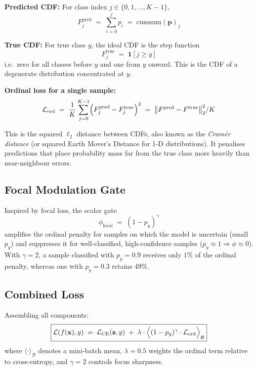 \documentclass[12pt, a4paper]{article}
\theoremstyle{definition}
\theoremstyle{remark}
\begin{document}
\textbf{Predicted CDF:} For class index $j \in \{0, 1, \ldots, K{-}1\}$,
\begin{equation}
    F_j^{\mathrm{pred}} \;=\; \sum_{i=0}^{j} p_i
    \;=\; \mathrm{cumsum}(\mathbf{p})_j
    \label{eq:predcdf}
\end{equation}

\textbf{True CDF:} For true class $y$, the ideal CDF is the step function
\begin{equation}
    F_j^{\mathrm{true}} \;=\; \mathbf{1}[j \geq y]
    \label{eq:truecdf}
\end{equation}
i.e.\ zero for all classes before $y$ and one from $y$ onward. This is
the CDF of a degenerate distribution concentrated at $y$.

\textbf{Ordinal loss for a single sample:}
\begin{equation}
    \mathcal{L}_{\mathrm{ord}} \;=\;
    \frac{1}{K}\sum_{j=0}^{K-1}
    \Bigl(F_j^{\mathrm{pred}} - F_j^{\mathrm{true}}\Bigr)^2
    \;=\;
    \bigl\|F^{\mathrm{pred}} - F^{\mathrm{true}}\bigr\|_2^2 / K
    \label{eq:ord}
\end{equation}

This is the squared $\ell_2$ distance between CDFs, also known as the
\emph{Cram\'{e}r distance} (or squared Earth Mover's Distance for 1-D
distributions). It penalises predictions that place probability mass far
from the true class more heavily than near-neighbour errors.

\subsection{Focal Modulation Gate}

Inspired by focal loss, the scalar gate
\begin{equation}
    \phi_{\mathrm{focal}} \;=\; (1 - p_y)^{\gamma}
    \label{eq:focal}
\end{equation}
amplifies the ordinal penalty for samples on which the model is
uncertain (small $p_y$) and suppresses it for well-classified,
high-confidence samples ($p_y \approx 1 \Rightarrow \phi \approx 0$).
With $\gamma = 2$, a sample classified with $p_y = 0.9$ receives only
$1\%$ of the ordinal penalty, whereas one with $p_y = 0.3$ retains $49\%$.

\subsection{Combined Loss}

Assembling all components:
\begin{equation}
    \boxed{
    \mathcal{L}(f(\mathbf{x}), y)
    \;=\;
    \mathcal{L}_{\mathrm{CE}}(\mathbf{z}, y)
    \;+\;
    \lambda\cdot
    \Bigl\langle (1-p_y)^{\gamma} \cdot \mathcal{L}_{\mathrm{ord}} \Bigr\rangle_{\mathcal{B}}
    }
    \label{eq:combined}
\end{equation}
where $\langle \cdot \rangle_{\mathcal{B}}$ denotes a mini-batch mean,
$\lambda = 0.5$ weights the ordinal term relative to cross-entropy, and
$\gamma = 2$ controls focus sharpness.
\end{document}
